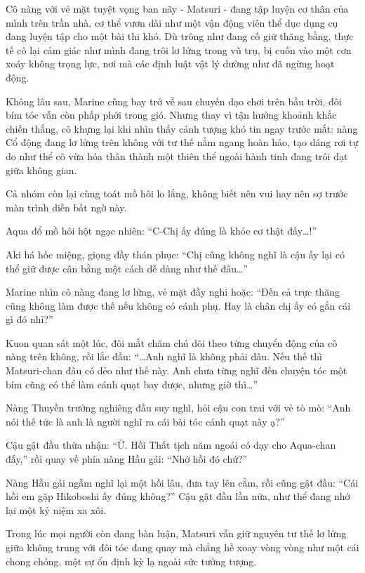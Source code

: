 \documentclass[../main.tex]{subfiles}
\begin{document}
Cô nàng với vẻ mặt tuyệt vọng ban nãy - Matsuri - đang tập luyện cơ thân của mình trên trần nhà, cơ thể vươn dài như một vận động viên thể dục dụng cụ đang luyện tập cho một bài thi khó. Dù trông như đang cố giữ thăng bằng, thực tế cô lại cảm giác như mình đang trôi lơ lửng trong vũ trụ, bị cuốn vào một cơn xoáy không trọng lực, nơi mà các định luật vật lý dường như đã ngừng hoạt động.


Không lâu sau, Marine cũng bay trở về sau chuyến dạo chơi trên bầu trời, đôi bím tóc vẫn còn phấp phới trong gió. Nhưng thay vì tận hưởng khoảnh khắc chiến thắng, cô khựng lại khi nhìn thấy cảnh tượng khó tin ngay trước mắt: nàng Cổ động đang lơ lửng trên không với tư thế nằm ngang hoàn hảo, tạo dáng rơi tự do như thể cô vừa hóa thân thành một thiên thể ngoài hành tinh đang trôi dạt giữa không gian.

Cả nhóm còn lại cùng toát mồ hôi lo lắng, không biết nên vui hay nên sợ trước màn trình diễn bất ngờ này.

Aqua đổ mồ hôi hột ngạc nhiên: ``C-Chị ấy đúng là khỏe cơ thật đấy\dots!''

Aki há hốc miệng, giọng đầy thán phục: ``Chị cũng không nghĩ là cậu ấy lại có thể giữ được cân bằng một cách dễ dàng như thế đâu\dots''

Marine nhìn cô nàng đang lơ lửng, vẻ mặt đầy nghi hoặc: ``Đến cả trực thăng cũng không làm được thế nếu không có cánh phụ. Hay là chân chị ấy có gắn cái gì đó nhỉ?''

Kuon quan sát một lúc, đôi mắt chăm chú dõi theo từng chuyển động của cô nàng trên không, rồi lắc đầu: ``\dots Anh nghĩ là không phải đâu. Nếu thế thì Matsuri-chan đâu có dẻo như thế này. Anh chưa từng nghĩ đến chuyện tóc một bím cũng có thể làm cánh quạt bay được, nhưng giờ thì\dots''

Nàng Thuyền trưởng nghiêng đầu suy nghĩ, hỏi cậu con trai với vẻ tò mò: ``Anh nói thế tức là anh là người nghĩ ra cái bài tóc cánh quạt này ạ?''

Cậu gật đầu thừa nhận: ``Ừ. Hồi Thất tịch năm ngoái có dạy cho Aqua-chan đấy,'' rồi quay về phía nàng Hầu gái: ``Nhớ hồi đó chứ?''

Nàng Hầu gái ngẫm nghĩ lại một hồi lâu, đưa tay lên cằm, rồi cũng gật đầu: ``Cái hồi em gặp Hikoboshi ấy đúng không?'' Cậu gật đầu lần nữa, như thể đang nhớ lại một kỷ niệm xa xôi.

Trong lúc mọi người còn đang bàn luận, Matsuri vẫn giữ nguyên tư thế lơ lửng giữa không trung với đôi tóc đang quay mà chẳng hề xoay vòng vòng như một cái chong chóng, một sự ổn định kỳ lạ ngoài sức tưởng tượng.
\end{document}
